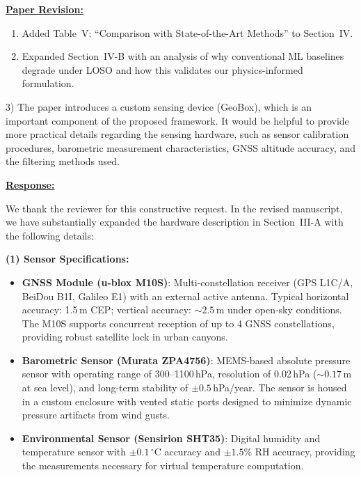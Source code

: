 \vspace{0.1cm}
\noindent
\underline{\textbf{Paper Revision:}}

\begin{enumerate}
    \item Added Table~V: ``Comparison with State-of-the-Art Methods'' to Section~IV.
    \item Expanded Section~IV-B with an analysis of why conventional ML baselines degrade under LOSO and how this validates our physics-informed formulation.
\end{enumerate}

\newpage

\begin{cmttwo}{}{}
3) The paper introduces a custom sensing device (GeoBox), which is an important component of the proposed framework. It would be helpful to provide more practical details regarding the sensing hardware, such as sensor calibration procedures, barometric measurement characteristics, GNSS altitude accuracy, and the filtering methods used.

\end{cmttwo}
\vspace{0.1cm}
\noindent
\underline{\textbf{Response:}}
\vspace{0.2cm}

We thank the reviewer for this constructive request. In the revised manuscript, we have substantially expanded the hardware description in Section~III-A with the following details:

\textbf{(1) Sensor Specifications:}
\begin{itemize}
    \item \textbf{GNSS Module (u-blox M10S)}: Multi-constellation receiver (GPS L1C/A, BeiDou B1I, Galileo E1) with an external active antenna. Typical horizontal accuracy: 1.5\,m CEP; vertical accuracy: ${\sim}2.5$\,m under open-sky conditions. The M10S supports concurrent reception of up to 4 GNSS constellations, providing robust satellite lock in urban canyons.
    \item \textbf{Barometric Sensor (Murata ZPA4756)}: MEMS-based absolute pressure sensor with operating range of 300--1100\,hPa, resolution of 0.02\,hPa (${\sim}0.17$\,m at sea level), and long-term stability of $\pm0.5$\,hPa/year. The sensor is housed in a custom enclosure with vented static ports designed to minimize dynamic pressure artifacts from wind gusts.
    \item \textbf{Environmental Sensor (Sensirion SHT35)}: Digital humidity and temperature sensor with $\pm0.1\,^{\circ}$C accuracy and $\pm1.5\%$ RH accuracy, providing the measurements necessary for virtual temperature computation.
\end{itemize}

